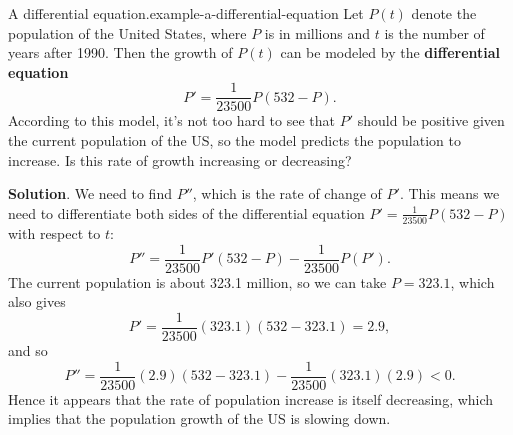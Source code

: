 \documentclass[10pt,]{book}
\newcommand{\terminology}[1]{\textbf{#1}}
\numberwithin{equation}{section}
\begin{document}
\begin{example}{A differential equation.}{example-a-differential-equation}%
\hypertarget{p-167}{}%
Let \(P(t)\) denote the population of the United States, where \(P\) is in millions and \(t\) is the number of years after 1990. Then the growth of \(P(t)\) can be modeled by the \terminology{differential equation}%
\begin{equation*}
P' = \frac{1}{23500}P(532-P).
\end{equation*}
According to this model, it's not too hard to see that \(P'\) should be positive given the current population of the US, so the model predicts the population to increase. Is this rate of growth increasing or decreasing?%
\par\smallskip%
\noindent\textbf{Solution}.\hypertarget{solution-36}{}\quad%
\hypertarget{p-168}{}%
We need to find \(P''\), which is the rate of change of \(P'\). This means we need to differentiate both sides of the differential equation \(P' = \frac{1}{23500}P(532-P)\) with respect to \(t\):%
\begin{equation*}
P'' = \frac{1}{23500}P'(532-P) - \frac{1}{23500}P(P').
\end{equation*}
The current population is about 323.1 million, so we can take \(P=323.1\), which also gives%
\begin{equation*}
P' = \frac{1}{23500}(323.1)(532-323.1) = 2.9,
\end{equation*}
and so%
\begin{equation*}
P'' = \frac{1}{23500}(2.9)(532-323.1) - \frac{1}{23500}(323.1)(2.9) < 0.
\end{equation*}
Hence it appears that the rate of population increase is itself decreasing, which implies that the population growth of the US is slowing down.%
\end{example}
%
%
\typeout{************************************************}
\typeout{************************************************}
%
\end{document}
